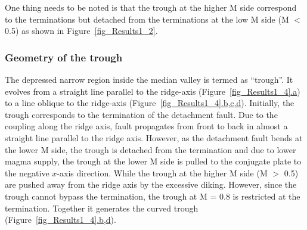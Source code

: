 One thing needs to be noted is that the trough at the higher M side correspond to the terminations but detached from the terminations at the low M side (M $<$ 0.5) as shown in Figure~\hyperref[fig_Results1_2]{\ref{fig_Results1_2}}.

\subsubsection{Geometry of the trough}

The depressed narrow region inside the median valley is termed as ``trough''. It evolves from a straight line parallel to the ridge-axis (Figure~\hyperref[fig_Results1_4]{\ref{fig_Results1_4}.a}) to a line oblique to the ridge-axis (Figure~\hyperref[fig_Results1_4]{\ref{fig_Results1_4}.b,c,d}). Initially, the trough corresponds to the termination of the detachment fault. Due to the coupling along the ridge axis, fault propagates from front to back in almost a straight line parallel to the ridge axis. However, as the detachment fault bends at the lower M side, the trough is detached from the termination and due to lower magma supply, the trough at the lower M side is pulled to the conjugate plate to the negative $x$-axis direction. While the trough at the higher M side (M $>$ 0.5) are pushed away from the ridge axis by the excessive diking. However, since the trough cannot bypass the termination, the trough at M = 0.8 is restricted at the termination. Together it generates the curved trough (Figure~\hyperref[fig_Results1_4]{\ref{fig_Results1_4}.b,d}). 


